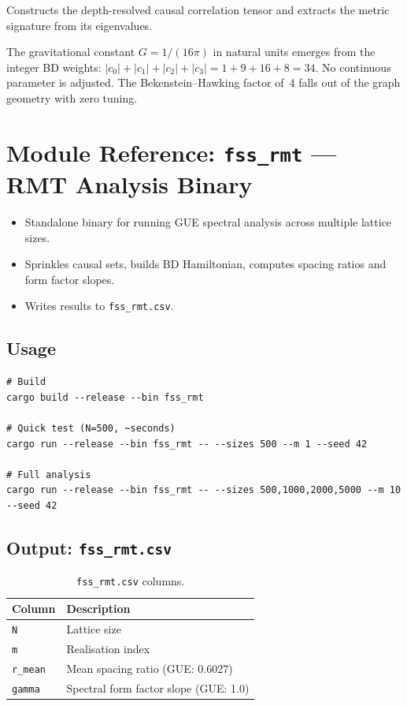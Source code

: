 \documentclass[11pt, a4paper, openany]{book}
\newcommand{\code}[1]{\texttt{#1}}
\newcommand{\modname}[1]{\texttt{\bfseries\color{main}#1}}
\newenvironment{introduction}[1][Chapter Overview]{%
  \begin{tcolorbox}[
    enhanced,colback=structure!5,colframe=structure,
    colbacktitle=structure,coltitle=white,
    fonttitle=\small\bfseries,title={#1},
    arc=2pt,boxrule=0.7pt,
    left=8pt,right=8pt,top=6pt,bottom=6pt,
    before skip=12pt,after skip=12pt
  ]\itshape\begin{itemize}[leftmargin=*,itemsep=2pt,parsep=0pt]
}{%
  \end{itemize}\end{tcolorbox}
}
\begin{document}
Constructs the depth-resolved causal correlation tensor and extracts the metric
signature from its eigenvalues.

\begin{result}
The gravitational constant $G = 1/(16\pi)$ in natural units emerges from the integer
BD weights: $|c_0| + |c_1| + |c_2| + |c_3| = 1 + 9 + 16 + 8 = 34$.  No continuous
parameter is adjusted.  The Bekenstein--Hawking factor of~4 falls out of the graph
geometry with zero tuning.
\end{result}


\chapter{Module Reference: \modname{fss\_rmt} --- RMT Analysis Binary}

\begin{introduction}[Finite-Size RMT Analysis]
  \item Standalone binary for running GUE spectral analysis across multiple lattice sizes.
  \item Sprinkles causal sets, builds BD Hamiltonian, computes spacing ratios and form factor slopes.
  \item Writes results to \code{fss\_rmt.csv}.
\end{introduction}

\section{Usage}

\begin{verbatim}
# Build
cargo build --release --bin fss_rmt

# Quick test (N=500, ~seconds)
cargo run --release --bin fss_rmt -- --sizes 500 --m 1 --seed 42

# Full analysis
cargo run --release --bin fss_rmt -- --sizes 500,1000,2000,5000 --m 10 --seed 42
\end{verbatim}

\section{Output: \code{fss\_rmt.csv}}

\begin{table}[H]
\centering
\begin{tabular}{@{} l l @{}}
\toprule
\textbf{Column} & \textbf{Description} \\
\midrule
\code{N}       & Lattice size \\
\code{m}       & Realisation index \\
\code{r\_mean} & Mean spacing ratio (GUE: 0.6027) \\
\code{gamma}   & Spectral form factor slope (GUE: 1.0) \\
\bottomrule
\end{tabular}
\caption{\code{fss\_rmt.csv} columns.}
\end{table}
\end{document}
